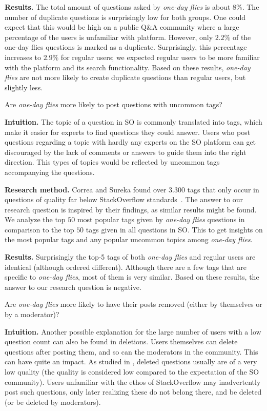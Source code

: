 \documentclass[conference]{IEEEtran}
\newcommand\odf{\emph{one-day flies}\xspace}
\newcommand\ru{regular users\xspace}
\begin{document}
\textbf{Results.} The total amount of questions asked by \odf is about 8\%. The
number of duplicate questions is surprisingly low for both groups. One could
expect that this would be high on a public Q\&A community where a large
percentage of the users is unfamiliar with platform. However, only $2.2\%$ of
the one-day flies questions is marked as a duplicate. Surprisingly, this
percentage increases to $2.9\%$ for \ru; we expected \ru to be more familiar
with the platform and its search functionality. Based on these results, \odf
are not more likely to create duplicate questions than regular users, but
slightly less.\\


\begin{tcolorbox}[size=fbox,title=RQ2: Uncommon Tags]
Are \odf more likely to post questions with uncommon tags?
\end{tcolorbox}

\textbf{Intuition.} The topic of a question in SO is commonly translated into
tags, which make it easier for experts to find questions they could answer.
Users who post questions regarding a topic with hardly any experts on the SO
platform can get discouraged by the lack of comments or answers to guide them
into the right direction. This types of topics would be reflected by uncommon
tags accompanying the questions. 
 
\textbf{Research method.} Correa and Sureka found over $3.300$ tags that only
occur in questions of quality far below StackOverflow
standards~\cite{correa2014chaff}. The answer to our research question is
inspired by their findings, as similar results might be found. We analyze the
top $50$ most popular tags given by \odf questions in comparison to the top
$50$ tags given in all questions in SO. This to get insights on the
most popular tags and any popular uncommon topics among \odf.

\textbf{Results.} Surprisingly the top-5 tags of both \odf and regular users
are identical (although ordered different). Although there are a few tags that
are specific to \odf, most of them is very similar. Based on these results, the
answer to our research question is negative.

\begin{tcolorbox}[size=fbox,title=RQ3: Deleted Questions]
Are \odf more likely to have their posts removed (either by
themselves or by a moderator)?
\end{tcolorbox}

\textbf{Intuition.} Another possible explanation for the large number of users
with a low question count can also be found in deletions. Users themselves can
delete questions after posting them, and so can the moderators in the
community. This can have quite an impact. As studied in \cite{correa2014chaff},
deleted questions usually are of a very low quality (the quality is considered
low compared to the expectation of the SO community). Users unfamiliar with the
ethos of StackOverflow may inadvertently post such questions, only later
realizing these do not belong there, and be deleted (or be deleted by
moderators). 
\end{document}
